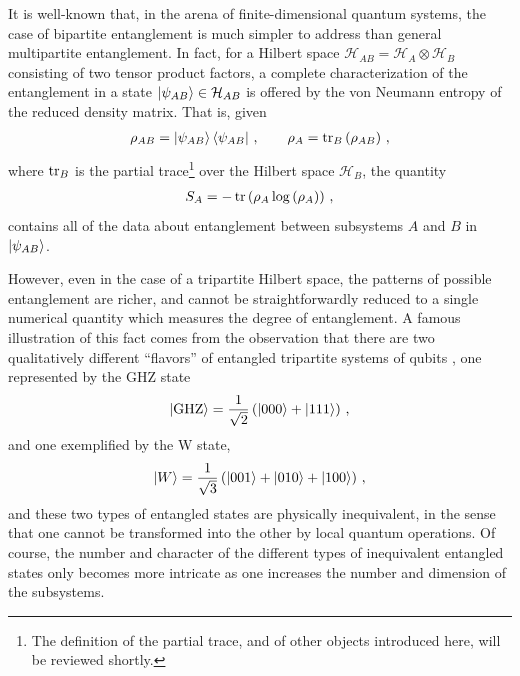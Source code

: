 \documentclass[12pt]{article}
\numberwithin{equation}{section}
\begin{document}
It is well-known that, in the arena of finite-dimensional quantum systems, the case of bipartite entanglement is much simpler to address than general multipartite entanglement. In fact, for a Hilbert space $\mathcal{H}_{AB} = \mathcal{H}_A \otimes \mathcal{H}_B$ consisting of two tensor product factors, a complete characterization of the entanglement in a state $\ket{\psi_{AB}} \in \mathcal{H}_{AB}$ is offered by the von Neumann entropy of the reduced density matrix. That is, given
%
\begin{align}
    \rho_{AB} = \ket{\psi_{AB}} \bra{\psi_{AB}} \, , \qquad \rho_A = \tr_B \left( \rho_{AB} \right) \, ,
\end{align}
%
where $\tr_B$ is the partial trace\footnote{The definition of the partial trace, and of other objects introduced here, will be reviewed shortly.} over the Hilbert space $\mathcal{H}_B$, the quantity
%
\begin{align}
    S_A = - \tr \left( \rho_A \log \left( \rho_A \right) \right) \, ,
\end{align}
%
contains all of the data about entanglement between subsystems $A$ and $B$ in $\ket{\psi_{AB}}$. 

However, even in the case of a tripartite Hilbert space, the patterns of possible entanglement are richer, and cannot be straightforwardly reduced to a single numerical quantity which measures the degree of entanglement. A famous illustration of this fact comes from the observation that there are two qualitatively different ``flavors'' of entangled tripartite systems of qubits \cite{PhysRevA.62.062314}, one represented by the GHZ state
%
\begin{align}\label{GHZ}
    \ket{ \text{GHZ} } = \frac{1}{\sqrt{2}} \left( \ket{000} + \ket{111} \right) \, ,
\end{align}
%
and one exemplified by the W state,
%
\begin{align}\label{W}
    \ket{W} = \frac{1}{\sqrt{3}} \left( \ket{001} + \ket{010} + \ket{100} \right) \, ,
\end{align}
%
and these two types of entangled states are physically inequivalent, in the sense that one cannot be transformed into the other by local quantum operations. Of course, the number and character of the different types of inequivalent entangled states only becomes more intricate as one increases the number and dimension of the subsystems. 
\end{document}
